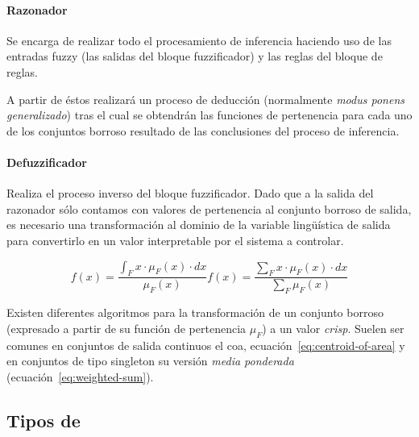 \paragraph{Razonador}

Se encarga de realizar todo el procesamiento de inferencia haciendo uso de las entradas fuzzy (las salidas del bloque fuzzificador) y las reglas del bloque de reglas.

A partir de éstos realizará un proceso de deducción (normalmente \textit{modus ponens generalizado}) tras el cual se obtendrán las funciones de pertenencia para cada uno de los conjuntos borroso resultado de las conclusiones del proceso de inferencia.

\paragraph{Defuzzificador}

Realiza el proceso inverso del bloque fuzzificador. Dado que a la salida del razonador sólo contamos con valores de pertenencia al conjunto borroso de salida, es necesario una transformación al dominio de la variable lingüística de salida para convertirlo en un valor interpretable por el sistema a controlar.

\begin{subequations}
	\begin{equation}
		f(x) = \frac{\int_{F} x \cdot \mu_F(x) \cdot dx}{\mu_F(x)}
		\label{eq:centroid-of-area}
	\end{equation}
	\begin{equation}
		f(x) = \frac{\sum_{F} x \cdot \mu_F(x) \cdot dx}{\sum_{F} \mu_F(x)}
		\label{eq:weighted-sum}
	\end{equation}
\end{subequations}

Existen diferentes algoritmos para la transformación de un conjunto borroso (expresado a partir de su función de pertenencia $\mu_F$) a un valor \textit{crisp}. Suelen ser comunes en conjuntos de salida continuos el \Acrfull{coa}, ecuación~\ref{eq:centroid-of-area} y en conjuntos de tipo singleton su versión \textit{media ponderada} (ecuación~\ref{eq:weighted-sum}).

\subsection{Tipos de }

